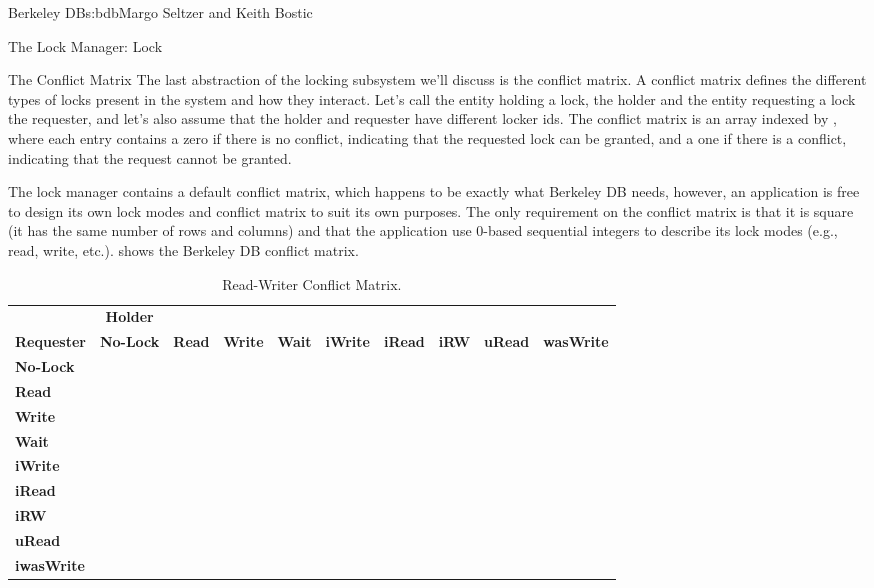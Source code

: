 \begin{aosachapter}{Berkeley DB}{s:bdb}{Margo Seltzer and Keith Bostic}
\begin{aosasect1}{The Lock Manager: Lock}
\begin{aosasect2}{The Conflict Matrix}
The last abstraction of the locking subsystem we'll discuss is the
conflict matrix. A conflict matrix defines the different types of
locks present in the system and how they interact. Let's call the
entity holding a lock, the holder and the entity requesting a lock the
requester, and let's also assume that the holder and requester have
different locker ids.  The conflict matrix is an array indexed by
\code{[requester][holder]}, where each entry contains a zero if there
is no conflict, indicating that the requested lock can be granted, and
a one if there is a conflict, indicating that the request cannot be
granted.

The lock manager contains a default conflict matrix, which happens to
be exactly what Berkeley DB needs, however, an application is free to
design its own lock modes and conflict matrix to suit its own
purposes.  The only requirement on the conflict matrix is that it is
square (it has the same number of rows and columns) and that the
application use 0-based sequential integers to describe its lock
modes (e.g., read, write, etc.).   
 shows the Berkeley DB conflict matrix.

\begin{table}[h]\small\centering
\begin{tabular} { | l | c | c | c | c | c | c | c | c | c | }
\hline
& {\bf Holder} & & & & & & & & \\
{\bf Requester} & {\bf No-Lock}	& {\bf Read} & {\bf Write} & {\bf Wait}	& {\bf iWrite} & {\bf iRead} & {\bf iRW} & {\bf uRead} & {\bf wasWrite}\\
\hline
{\bf No-Lock}	&	&	& &	& & &	& & \\
\hline
{\bf Read}	& 		& 		& \checkmark & 		& \checkmark   & 	     & \checkmark & 	       & \checkmark\\
\hline
{\bf Write}	& 		& \checkmark	& \checkmark & \checkmark & \checkmark & \checkmark   & \checkmark & \checkmark	& \checkmark\\
\hline
{\bf Wait}	& 		& 		& 	   & 		& 	       & 	     & 	 	& 	       & \\
\hline
{\bf iWrite}	& 		& \checkmark	& \checkmark & 		& 	       & 	     & 	 	& \checkmark   & \checkmark\\
\hline
{\bf iRead}	& 		& 		& \checkmark & 		& 	       & 	     & 	 	& 	       & \checkmark\\
\hline
{\bf iRW}	& 		& \checkmark	& \checkmark & 		& 	       & 	     & 	 	& \checkmark   & \checkmark\\
\hline
{\bf uRead}	& 		& 		& \checkmark & 		& \checkmark   & 	     & \checkmark & 	       & \\
\hline
{\bf iwasWrite}	& 		& \checkmark	& \checkmark & 		& \checkmark   & \checkmark  & \checkmark & 	       & \checkmark\\
\hline
\end{tabular}
\caption{Read-Writer Conflict Matrix.}
\label{tbl.bdb.two}
\end{table}


\end{aosasect2}
\end{aosasect1}
\end{aosachapter}
